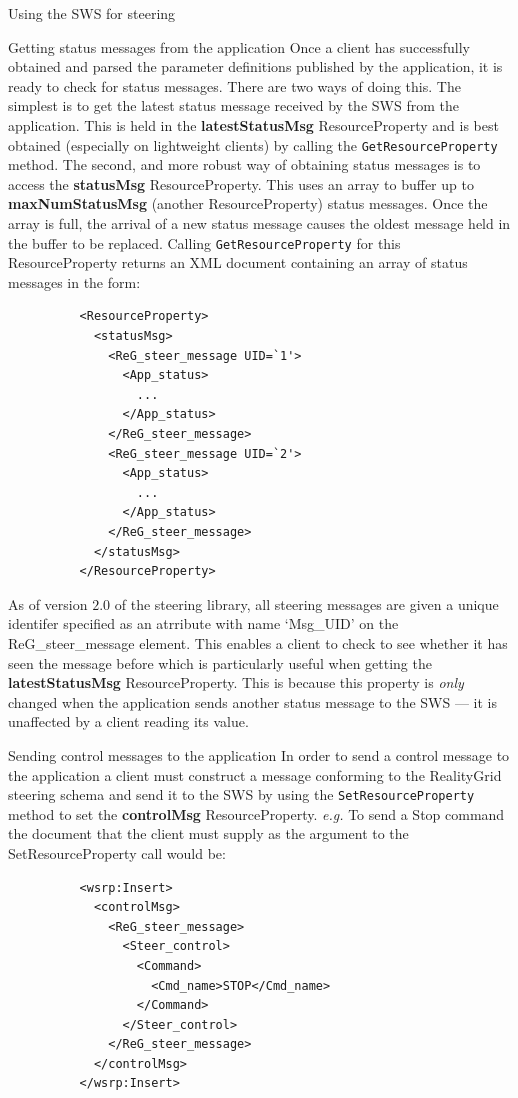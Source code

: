 \documentclass[a4paper]{article}
\begin{document}
\begin{section}{Using the SWS for steering}
\begin{subsection}{Getting status messages from the application}
Once a client has successfully obtained and parsed the parameter
definitions published by the application, it is ready to check for
status messages.  There are two ways of doing this.  The simplest is
to get the latest status message received by the SWS from the
application.  This is held in the {\bf latestStatusMsg} ResourceProperty and
is best obtained (especially on lightweight clients) by calling the
\texttt{GetResourceProperty} method.  The second, and more robust way of
obtaining status messages is to access the {\bf statusMsg} ResourceProperty.
This uses an array to buffer up to {\bf maxNumStatusMsg} (another
ResourceProperty) status messages.  Once the array is full, the
arrival of a new status message causes the oldest message held in the
buffer to be replaced.  Calling \texttt{GetResourceProperty} for this
ResourceProperty returns an XML document containing an array of status
messages in the form:
\begin{verbatim}
          <ResourceProperty>
            <statusMsg>
              <ReG_steer_message UID=`1'>
                <App_status>
                  ...
                </App_status>
              </ReG_steer_message>
              <ReG_steer_message UID=`2'>
                <App_status>
                  ...
                </App_status>
              </ReG_steer_message>
            </statusMsg>
          </ResourceProperty>
\end{verbatim}

As of version $2.0$ of the steering library, all steering messages are
given a unique identifer specified as an atrribute with name `Msg\_UID' on
the ReG\_steer\_message element.  This enables a client to check to see
whether it has seen the message before which is particularly useful
when getting the  {\bf latestStatusMsg} ResourceProperty.  This is because
this property is {\em only} changed when the application sends another
status message to the SWS --- it is unaffected by a client reading its
value.
\end{subsection}

\begin{subsection}{Sending control messages to the application}
In order to send a control message to the application a client must
construct a message conforming to the RealityGrid steering schema and
send it to the SWS by using the \texttt{SetResourceProperty} method to
set the {\bf controlMsg} ResourceProperty. {\it e.g.} To send a Stop
command the document that the client must supply as the argument to
the SetResourceProperty call would be:
\begin{verbatim}
          <wsrp:Insert>
            <controlMsg>
              <ReG_steer_message>
                <Steer_control>
                  <Command>
                    <Cmd_name>STOP</Cmd_name>
                  </Command>
                </Steer_control>
              </ReG_steer_message>
            </controlMsg>
          </wsrp:Insert>
\end{verbatim}
\end{subsection}


\end{section}
\end{document}
